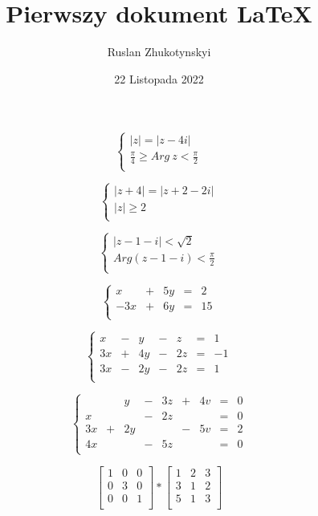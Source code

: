 \documentclass[12pt, letterpaper, titlepage]{article}
\title{Pierwszy dokument LaTeX}
\author{Ruslan Zhukotynskyi}
\date{22 Listopada 2022}
\begin{document}
\maketitle

$$ 
\begin{cases}
|z| = |z - 4i| \\
\frac{\pi}{4} \geq Arg \ z < \frac{\pi}{2} \\
\end{cases}
$$

$$
\begin{cases}
|z + 4| = |z + 2 - 2i| \\
|z| \geq 2 \\
\end{cases}
$$

$$
\begin{cases}
|z - 1 - i| < \sqrt{2} \\
Arg(z - 1 - i) < \frac{\pi}{2}\\
\end{cases}
$$

$$
\left\{
\begin{array}{rrrrr}
x&+&5y&=&2 \\
-3x&+&6y&=&15 \\
\end{array}
\right.
$$

$$
\left\{
\begin{array}{rrrrrrr}
x&-&y&-&z&=&1 \\
3x&+&4y&-&2z&=&-1 \\
3x&-&2y&-&2z&=&1 \\
\end{array}
\right.
$$

$$
\left\{
\begin{array}{rrrrrrrrr}
\ & \ &y&-&3z&+&4v&=&0 \\
x& \ & \ &-&2z& \ & \ &=&0 \\
3x&+&2y& \ & \ &-&5v&=&2 \\
4x& \ & \ &-&5z& \ & \ &=&0 \\
\end{array}
\right.
$$

$$
\left[ \begin{array}{ccc}
1 & 0 & 0 \\
0 & 3 & 0 \\
0 & 0 & 1 \\
\end{array} \right] 
*
\left[ \begin{array}{ccc}
1 & 2 & 3 \\
3 & 1 & 2 \\
5 & 1 & 3 \\
\end{array} \right]
$$
\end{document}
